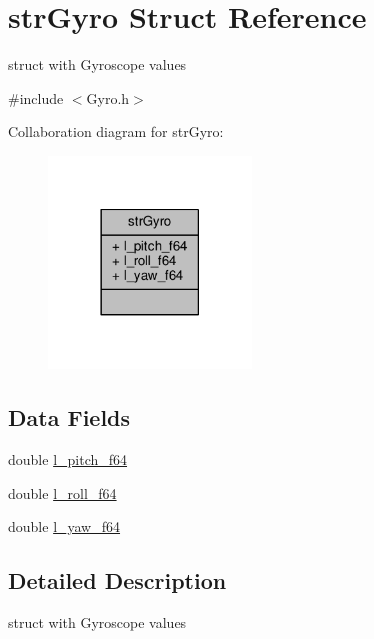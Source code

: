 \hypertarget{structstrGyro}{\section{str\+Gyro Struct Reference}
\label{structstrGyro}
}


struct with Gyroscope values  




{\ttfamily \#include $<$Gyro.\+h$>$}



Collaboration diagram for str\+Gyro\+:
\nopagebreak
\begin{figure}[H]
\begin{center}
\leavevmode
\includegraphics[width=153pt]{structstrGyro__coll__graph}
\end{center}
\end{figure}
\subsection*{Data Fields}
\begin{DoxyCompactItemize}
\item 
double \hyperlink{structstrGyro_a9d82fa8970135f2097dd209a74138848_a9d82fa8970135f2097dd209a74138848}{l\+\_\+pitch\+\_\+f64}
\item 
double \hyperlink{structstrGyro_a0b8d0c0ec6e3324a403d983d67fae643_a0b8d0c0ec6e3324a403d983d67fae643}{l\+\_\+roll\+\_\+f64}
\item 
double \hyperlink{structstrGyro_a1c8ca43d350ad8ef20d2968aa29e6ce6_a1c8ca43d350ad8ef20d2968aa29e6ce6}{l\+\_\+yaw\+\_\+f64}
\end{DoxyCompactItemize}


\subsection{Detailed Description}
struct with Gyroscope values 



